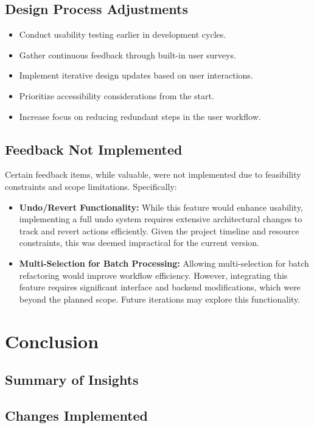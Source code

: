 \documentclass{article}
\begin{document}
\subsection{Design Process Adjustments}
\begin{itemize}
\item Conduct usability testing earlier in development cycles.
\item Gather continuous feedback through built-in user surveys.
\item Implement iterative design updates based on user interactions.
\item Prioritize accessibility considerations from the start.
\item Increase focus on reducing redundant steps in the user workflow.
\end{itemize}

\subsection{Feedback Not Implemented}
Certain feedback items, while valuable, were not implemented due to feasibility constraints and scope limitations. Specifically:
\begin{itemize}
\item \textbf{Undo/Revert Functionality:} While this feature would enhance usability, implementing a full undo system requires extensive architectural changes to track and revert actions efficiently. Given the project timeline and resource constraints, this was deemed impractical for the current version.
\item \textbf{Multi-Selection for Batch Processing:} Allowing multi-selection for batch refactoring would improve workflow efficiency. However, integrating this feature requires significant interface and backend modifications, which were beyond the planned scope. Future iterations may explore this functionality.
\end{itemize}


\newpage
\section{Conclusion}
\subsection{Summary of Insights}
\subsection{Changes Implemented}
\label{subsec:changes}
\end{document}
